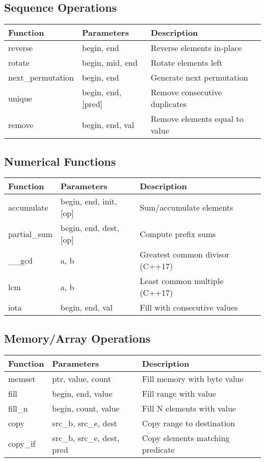 \documentclass[10pt]{article}
\begin{document}
\begin{multicols*}{2}
\subsection*{Sequence Operations}
\begin{tabularx}{\linewidth}{|l|l|X|}
    \hline
    \textbf{Function} & \textbf{Parameters} & \textbf{Description} \\
    \hline
    reverse & begin, end & Reverse elements in-place \\
    \hline
    rotate & begin, mid, end & Rotate elements left \\
    \hline
    next\_permutation & begin, end & Generate next permutation \\
    \hline
    unique & begin, end, [pred] & Remove consecutive duplicates \\
    \hline
    remove & begin, end, val & Remove elements equal to value \\
    \hline
\end{tabularx}

\subsection*{Numerical Functions}
\begin{tabularx}{\linewidth}{|l|l|X|}
    \hline
    \textbf{Function} & \textbf{Parameters} & \textbf{Description} \\
    \hline
    accumulate & begin, end, init, [op] & Sum/accumulate elements \\
    \hline
    partial\_sum & begin, end, dest, [op] & Compute prefix sums \\
    \hline
    \_\_gcd & a, b & Greatest common divisor (C++17) \\
    \hline
    lcm & a, b & Least common multiple (C++17) \\
    \hline
    iota & begin, end, val & Fill with consecutive values \\
    \hline
\end{tabularx}

\subsection*{Memory/Array Operations}
\begin{tabularx}{\linewidth}{|l|l|X|}
    \hline
    \textbf{Function} & \textbf{Parameters} & \textbf{Description} \\
    \hline
    memset & ptr, value, count & Fill memory with byte value \\
    \hline
    fill & begin, end, value & Fill range with value \\
    \hline
    fill\_n & begin, count, value & Fill N elements with value \\
    \hline
    copy & src\_b, src\_e, dest & Copy range to destination \\
    \hline
    copy\_if & src\_b, src\_e, dest, pred & Copy elements matching predicate \\
    \hline
\end{tabularx}


\end{multicols*}
\end{document}
